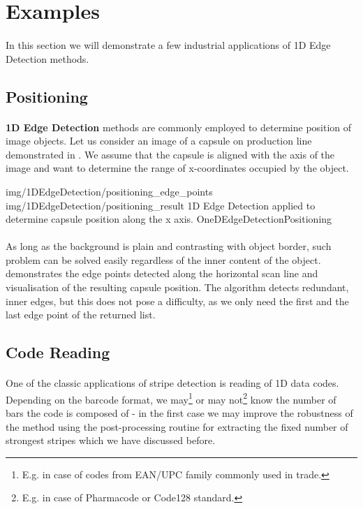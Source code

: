 \section{Examples}

\paragraph*{}
In this section we will demonstrate a few industrial applications of 1D Edge Detection methods.

\subsection{Positioning}

\paragraph*{}
\textbf{1D Edge Detection} methods are commonly employed to determine position of image objects. Let us consider an image of a capsule on production line demonstrated in . We assume that the capsule is aligned with the axis of the image and want to determine the range of x-coordinates occupied by the object.

\twoFigures
{img/1DEdgeDetection/positioning_edge_points}
{img/1DEdgeDetection/positioning_result}
{1D Edge Detection applied to determine capsule position along the x axis.}
{OneDEdgeDetectionPositioning}
{\basicWidth}

\paragraph*{}
As long as the background is plain and contrasting with object border, such problem can be solved easily regardless of the inner content of the object.  demonstrates the edge points detected along the horizontal scan line and visualisation of the resulting capsule position. The algorithm detects redundant, inner edges, but this does not pose a difficulty, as we only need the first and the last edge point of the returned list.

\subsection{Code Reading}

\paragraph*{}
One of the classic applications of stripe detection is reading of 1D data codes. Depending on the barcode format, we may\footnote{E.g. in case of codes from EAN/UPC family commonly used in trade.} or may not\footnote{E.g. in case of Pharmacode or Code128 standard.} know the number of bars the code is composed of - in the first case we may improve the robustness of the method using the post-processing routine for extracting the fixed number of strongest stripes which we have discussed before.

